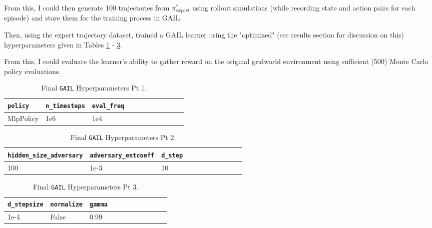 From this, I could then generate 100 trajectories from $\pi^*_{expert}$ using rollout simulations (while recording state and action pairs for each episode) and store them for the training process in GAIL.

Then, using the expert trajectory dataset, trained a GAIL learner using the "optimized" (see results section for discussion on this) hyperparameters given in Tables \ref{t: gail_hyperparameters_1} - \ref{t: gail_hyperparameters_3}.

From this, I could evaluate the learner's ability to gather reward on the original gridworld environment using sufficient (500) Monte Carlo policy evaluations.


\begin{table}
    \caption{Final \texttt{GAIL} Hyperparameters Pt 1.}
    \centering
    \begin{tabular}{|l|l|l|l|l|l|l|l|l|l|l|}
    \hline
        \texttt{policy} & \texttt{n\_timesteps} & \texttt{eval\_freq}\\ \hline
        MlpPolicy & 1e6 & 1e4 \\ \hline
    \end{tabular}
    \label{t: gail_hyperparameters_1}
\end{table}

\begin{table}
    \caption{Final \texttt{GAIL} Hyperparameters Pt 2.}
    \centering
    \begin{tabular}{|l|l|l|l|l|l|l|l|l|l|l|}
    \hline
        \texttt{hidden\_size\_adversary} & \texttt{adversary\_entcoeff} & \texttt{d\_step}\\ \hline
        100 & 1e-3 & 10 \\ \hline
    \end{tabular}
    \label{t: gail_hyperparameters_2}
\end{table}

\begin{table}
    \caption{Final \texttt{GAIL} Hyperparameters Pt 3.}
    \centering
    \begin{tabular}{|l|l|l|l|l|l|l|l|l|l|l|}
    \hline
        \texttt{d\_stepsize} & \texttt{normalize} & \texttt{gamma}\\ \hline
        1e-4 & False & 0.99\\ \hline
    \end{tabular}
    \label{t: gail_hyperparameters_3}
\end{table}